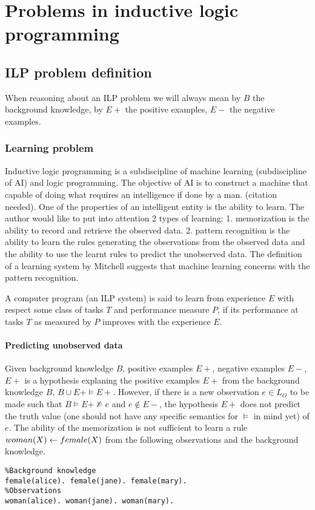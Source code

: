 \chapter{Problems in inductive logic programming}

\section{ILP problem definition}
When reasoning about an ILP problem we will always mean by $B$ the background knowledge, by $E+$ the positive examples, $E-$ the negative examples.

\subsection{Learning problem}
Inductive logic programming is a subdiscipline of machine learning (subdiscipline of AI) and logic programming. The objective of AI is to construct a machine that capable of doing what requires an intelligence if done by a man. (citation needed). One of the properties of an intelligent entity is the ability to learn. The author would like to put into attention 2 types of learning:
1. memorization is the ability to record and retrieve the observed data.
2. pattern recognition is the ability to learn the rules generating the observations from the observed data and the ability to use the learnt rules to predict the unobserved data. The definition of a learning system by Mitchell suggests that machine learning concerns with the pattern recognition.

\begin{defn}\cite{mitchell1997machine}
A computer program (an ILP system) is said to learn from experience $E$
with respect some class of tasks $T$ and performance measure $P$,
if its performance at tasks $T$ as measured by $P$ improves with the experience $E$.
\end{defn}

\subsubsection{Predicting unobserved data}
Given background knowledge $B$, positive examples $E+$, negative examples $E-$, $E+$ is a hypothesis explaning the positive examples $E+$ from the background knowledge $B$, $B \cup E+ \models E+$.
However, if there is a new observation $e \in L_O$ to be made such that
$B \models E+ \not\models e$ and $e \not\in E-$, the hypothesis $E+$ does not predict the truth value (one should not have any specific semantics for $\models$ in mind yet) of $e$. The ability of the memorization is not sufficient to learn a rule $woman(X) \leftarrow female(X)$ from the following observations and the background knowledge.
\begin{lstlisting}
%Background knowledge
female(alice). female(jane). female(mary).
%Observations
woman(alice). woman(jane). woman(mary).
\end{lstlisting}

